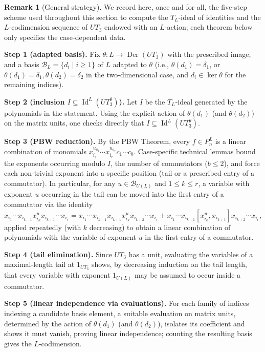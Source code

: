 \documentclass[a4paper,reqno]{amsart}
\theoremstyle{definition}
\newtheorem{remark}[theorem]{Remark}
\numberwithin{equation}{section}
\numberwithin{theorem}{section}
\DeclareMathOperator{\I}{Id}
\newcommand{\B}{\mathcal{B}}
\DeclareMathOperator{\D}{Der}
\begin{document}
\begin{remark}[General strategy]\label{rmk: general-strategy}
We record here, once and for all, the five-step scheme used throughout this section to compute
the $T_L$-ideal of identities and the $L$-codimension sequence of $UT_3$ endowed with an
$L$-action; each theorem below only specifies the case-dependent data.

\smallskip
\textbf{Step 1 (adapted basis).} Fix $\theta:L\to\D(UT_3)$ with the prescribed image, and a basis
$\mathcal B_L=\{d_i\mid i\ge1\}$ of $L$ adapted to $\theta$ (i.e., $\theta(d_1)=\delta_1$, or
$\theta(d_1)=\delta_1,\theta(d_2)=\delta_2$ in the two-dimensional case, and $d_i\in\ker\theta$
for the remaining indices).

\smallskip
\textbf{Step 2 (inclusion $I\subseteq\I^L(UT_3^\theta)$).} Let $I$ be the $T_L$-ideal generated by the
polynomials in the statement. Using the explicit action of $\theta(d_1)$ (and $\theta(d_2)$) on
the matrix units, one checks directly that $I\subseteq\I^L(UT_3^\theta)$.

\smallskip
\textbf{Step 3 (PBW reduction).} By the PBW Theorem, every $f\in P_n^L$ is a linear combination of
monomials $x_{i_1}^{u_{a_1}}\cdots x_{i_r}^{u_{a_r}}c_1\cdots c_b$. Case-specific technical lemmas
bound the exponents occurring modulo $I$, the number of commutators ($b\le2$), and force each
non-trivial exponent into a specific position (tail or a prescribed entry of a commutator).  In
particular, for any $u\in \B_{U(L)}$ and $1\le k\le r$, a variable with exponent $u$ occurring in
the tail can be moved into the first entry of a commutator via the identity
\begin{equation}\label{eq: tail-to-commutator}
x_{i_1}\cdots x_{i_{k-1}}x_{i_k}^{u}x_{i_{k+1}}\cdots x_{i_r} = x_{i_1}\cdots x_{i_{k-1}}x_{i_{k+1}}x_{i_k}^{u}x_{i_{k+2}}\cdots x_{i_r} + x_{i_1}\cdots x_{i_{k-1}}[x_{i_k}^{u},x_{i_{k+1}}]x_{i_{k+2}}\cdots x_{i_r},
\end{equation}
applied repeatedly (with $k$ decreasing) to obtain a linear combination of polynomials with the
variable of exponent $u$ in the first entry of a commutator.


\smallskip
\textbf{Step 4 (tail elimination).} Since $UT_3$ has a unit, evaluating the variables of a
maximal-length tail at $1_{UT_3}$ shows, by decreasing induction on the tail length, that every
variable with exponent $1_{U(L)}$ may be assumed to occur inside a commutator.

\smallskip
\textbf{Step 5 (linear independence via evaluations).} For each family of indices indexing a
candidate basis element, a suitable evaluation on matrix units, determined by the action of
$\theta(d_1)$ (and $\theta(d_2)$), isolates its coefficient and shows it must vanish, proving
linear independence; counting the resulting basis gives the $L$-codimension.
\end{remark}
\end{document}
